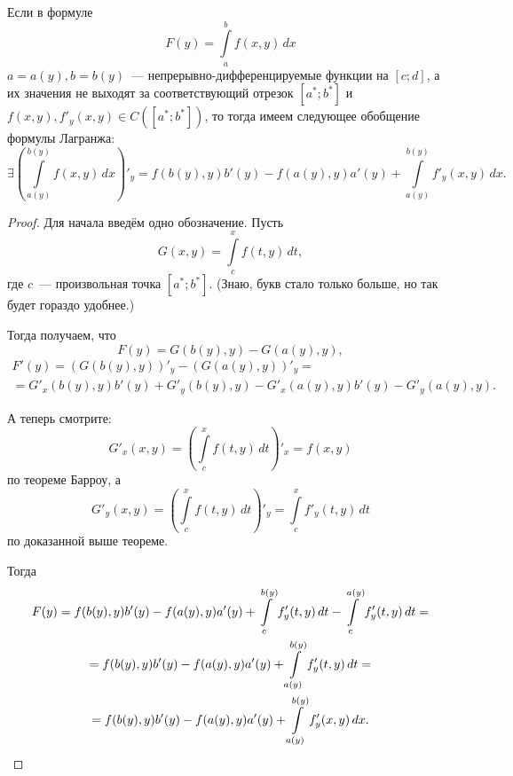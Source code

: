 \documentclass[../../main.tex]{subfiles}
\begin{document}
\begin{rem}
	Если в формуле
	\[F(y) = \int\limits_a^b f(x, y)\,dx\]
	$a = a(y), b = b(y)$~--- непрерывно-дифференцируемые функции на $[c; d]$,
	а их значения не выходят за соответствующий отрезок $[a^*;b^*]$ и $f(x, y),
	f'_y(x, y)\in C([a^*; b^*])$, то тогда имеем следующее 
	обобщение формулы Лагранжа:
	\[\exists \left(\int\limits_{a(y)}^{b(y)} f(x, y)\,dx\right)'_y = 
	f(b(y), y)b'(y) - f(a(y), y)a'(y) + 
	\int\limits_{a(y)}^{b(y)}f'_y(x, y)\,dx.\]
\end{rem}

\begin{proof}
	Для начала введём одно обозначение. Пусть
	\[G(x, y) = \int\limits_c^x f(t, y)\,dt,\]
	где $c$~--- произвольная точка $[a^*;b^*]$. 
	(Знаю, букв стало только больше, но так будет гораздо удобнее.)
	
	Тогда получаем, что
	\[F(y) = G(b(y), y) - G(a(y), y),\]
	\begin{gather*}
		F'(y) = \left(G(b(y), y)\right)'_y -\left(G(a(y), y)\right)'_y =\\
		= G'_x(b(y), y)b'(y) + G'_y(b(y), y) - G'_x(a(y), y)b'(y) - 
		G'_y(a(y), y).
	\end{gather*}
	
	А теперь смотрите:
	\[G'_x(x, y) = \left(\int\limits_c^x f(t, y)\,dt\right)'_x = f(x, y)\]
	по теореме Барроу, а
	\[G'_y(x, y) = \left(\int\limits_c^x f(t, y)\,dt\right)'_y =
	\int\limits_c^x f'_y(t, y)\,dt\]
	по доказанной выше теореме.
	
	Тогда
	\begin{gather*}
		F(y) = f(b(y), y)b'(y) - f(a(y), y)a'(y) + 
		\int\limits_c^{b(y)} f'_y(t, y)\,dt - 
		\int\limits_c^{a(y)} f'_y(t, y)\,dt =\\
		= f(b(y), y)b'(y) - f(a(y), y)a'(y) + 
		\int\limits_{a(y)}^{b(y)} f'_y(t, y)\,dt =\\
		= f(b(y), y)b'(y) - f(a(y), y)a'(y) + 
		\int\limits_{a(y)}^{b(y)} f'_y(x, y)\,dx. \qedhere
	\end{gather*}
\end{proof}
\end{document}
